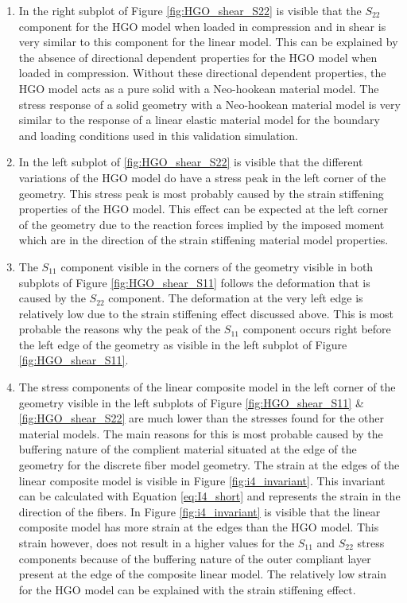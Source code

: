 \begin{enumerate}
    \item In the right subplot of Figure \ref{fig:HGO_shear_S22} is visible that the $S_{22}$ component for the HGO model when loaded in compression and in shear is very similar to this component for the linear model. This can be explained by the absence of directional dependent properties for the HGO model when loaded in compression. Without these directional dependent properties, the HGO model acts as a pure solid with a Neo-hookean material model. The stress response of a solid geometry with a Neo-hookean material model is very similar to the response of a linear elastic material model for the boundary and loading conditions used in this validation simulation.
    \item In the left subplot of \ref{fig:HGO_shear_S22} is visible that the different variations of the HGO model do have a stress peak in the left corner of the geometry. This stress peak is most probably caused by the strain stiffening properties of the HGO model. This effect can be expected at the left corner of the geometry due to the reaction forces implied by the imposed moment which are in the direction of the strain stiffening material model properties.  
    \item The $S_{11}$ component visible in the corners of the geometry visible in both subplots of Figure \ref{fig:HGO_shear_S11} follows the deformation that is caused by the $S_{22}$ component. The deformation at the very left edge is relatively low due to the strain stiffening effect discussed above. This is most probable the reasons why the peak of the $S_{11}$ component occurs right before the left edge of the geometry as visible in the left subplot of Figure \ref{fig:HGO_shear_S11}. 
    \item The stress components of the linear composite model in the left corner of the geometry visible in the left subplots of Figure \ref{fig:HGO_shear_S11} \& \ref{fig:HGO_shear_S22} are much lower than the stresses found for the other material models. The main reasons for this is most probable caused by the buffering nature of the complient material situated at the edge of the geometry for the discrete fiber model geometry. The strain at the edges of the linear composite model is visible in Figure \ref{fig:i4_invariant}. This invariant can be calculated with Equation \ref{eq:I4_short} and represents the strain in the direction of the fibers. In Figure \ref{fig:i4_invariant} is visible that the linear composite model has more strain at the edges than the HGO model. This strain however, does not result in a higher values for the $S_{11}$ and $S_{22}$ stress components because of the buffering nature of the outer compliant layer present at the edge of the composite linear model. The relatively low strain for the HGO model can be explained with the strain stiffening effect. 

\end{enumerate}
